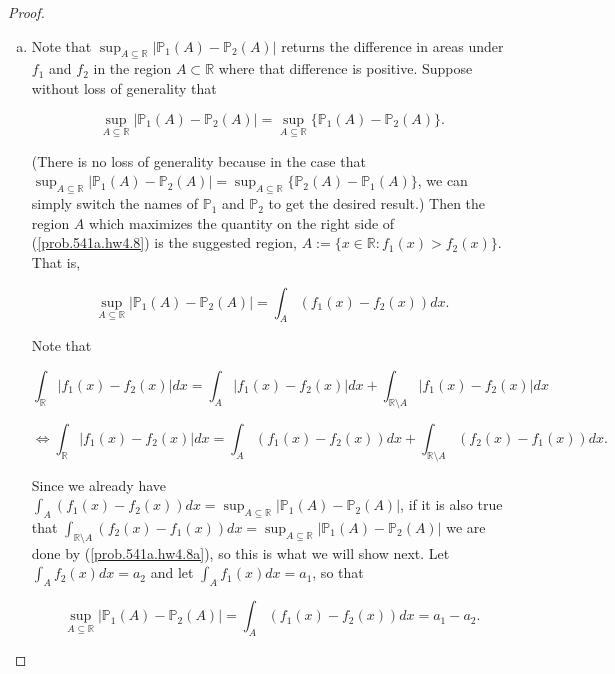 \begin{proof}

\begin{enumerate}[(a)]

%
%

\item Note that \(\sup_{A\subseteq\mathbb{R}}| \mathbb{P}_{1}(A)-\mathbb{P}_{2}(A)|\) returns the difference in areas under \(f_1\) and \(f_2\) in the region \(A \subset \mathbb{R}\) where that difference is positive. Suppose without loss of generality that 

\begin{equation}\label{prob.541a.hw4.8}
\sup_{A\subseteq\mathbb{R}}| \mathbb{P}_{1}(A)-\mathbb{P}_{2}(A)| = \sup_{A\subseteq\mathbb{R}} \{\mathbb{P}_{1}(A)-\mathbb{P}_{2}(A)\}.
\end{equation}

 (There is no loss of generality because in the case that \(\sup_{A\subseteq\mathbb{R}}| \mathbb{P}_{1}(A)-\mathbb{P}_{2}(A)| = \sup_{A\subseteq\mathbb{R}} \{ \mathbb{P}_{2}(A)-\mathbb{P}_{1}(A)\}\), we can simply switch the names of \(\mathbb{P}_1\) and \(\mathbb{P}_2\) to get the desired result.) Then the region \(A\) which maximizes the quantity on the right side of (\ref{prob.541a.hw4.8}) is the suggested region, \(A:=\{x\in\mathbb{R}:f_{1}(x)> f_{2}(x)\}\). That is,
 
 \[
 \sup_{A\subseteq\mathbb{R}}| \mathbb{P}_{1}(A)-\mathbb{P}_{2}(A)| =  \int_{A}(f_{1}(x)-f_{2}(x))dx.
 \]
 
 Note that
 
 \[
 \int_{\mathbb{R}}|f_{1}(x)-f_{2}(x)|dx  =  \int_{A}|f_{1}(x)-f_{2}(x)|dx  +  \int_{\mathbb{R} \setminus A}|f_{1}(x)-f_{2}(x)|dx   
 \]
 
\begin{equation}\label{prob.541a.hw4.8a}
\iff  \int_{\mathbb{R}}|f_{1}(x)-f_{2}(x)|dx  =  \int_{A}(f_{1}(x)-f_{2}(x))dx +  \int_{\mathbb{R} \setminus A}(f_{2}(x)-f_{1}(x))dx .
\end{equation}
 
Since we already have \(  \int_{A}(f_{1}(x)-f_{2}(x))dx  = \sup_{A\subseteq\mathbb{R}}| \mathbb{P}_{1}(A)-\mathbb{P}_{2}(A)| \), if it is also true that \( \int_{\mathbb{R} \setminus A}(f_{2}(x)-f_{1}(x))dx  =  \sup_{A\subseteq\mathbb{R}}| \mathbb{P}_{1}(A)-\mathbb{P}_{2}(A)| \) we are done by (\ref{prob.541a.hw4.8a}), so this is what we will show next. Let \(\int_A f_2(x) dx = a_2\) and let \(\int_A f_1(x) dx = a_1\), so that 

\[
\sup_{A\subseteq\mathbb{R}}| \mathbb{P}_{1}(A)-\mathbb{P}_{2}(A)|  = \int_{A}(f_{1}(x)-f_{2}(x))dx = a_1 - a_2.
\]


\end{enumerate}
\end{proof}
